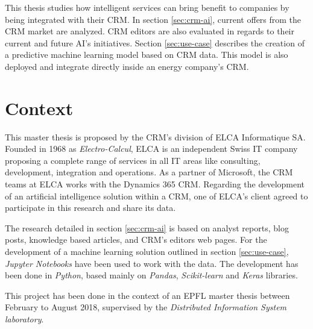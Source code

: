 This thesis studies how intelligent services can bring benefit to companies by being integrated with their CRM. In section \ref{sec:crm-ai}, current offers from the CRM market are analyzed. CRM editors are also evaluated in regards to their current and future AI's initiatives. Section \ref{sec:use-case} describes the creation of a predictive machine learning model based on CRM data. This model is also deployed and integrate directly inside an energy company's CRM.


\section{Context}
This master thesis is proposed by the CRM's division of ELCA Informatique SA. Founded in 1968 as \textit{Electro-Calcul}, ELCA is an independent Swiss IT company proposing a complete range of services in all IT areas like consulting, development, integration and operations. As a partner of Microsoft, the CRM teams at ELCA works with the Dynamics 365 CRM. Regarding the development of an artificial intelligence solution within a CRM, one of ELCA's client agreed to participate in this research and share its data.

The research detailed in section \ref{sec:crm-ai} is based on analyst reports, blog posts, knowledge based articles, and CRM's editors web pages. For the development of a machine learning solution outlined in section \ref{sec:use-case}, \textit{Jupyter Notebooks} have been used to work with the data. The development has been done in \textit{Python}, based mainly on \textit{Pandas}, \textit{Scikit-learn} and \textit{Keras} libraries.

This project has been done in the context of an EPFL master thesis between February to August 2018, supervised by the \textit{Distributed Information System laboratory}.